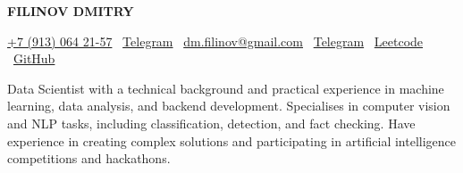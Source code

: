 \begin{center}
  {\huge\rmfamily\bfseries FILINOV DMITRY}
\end{center}
\begin{center}
\href{tel:+79130642157}{+7 (913) 064 21-57} \textbar\ 
\href{https://t.me/d1ffic00lt}{Telegram} \textbar\ 
\href{mailto:dm.filinov@gmail.com}{dm.filinov@gmail.com} \textbar\
  \href{https://t.me/D1ffic00lt}{Telegram} \textbar\ 
  \href{https://leetcode.com/u/D1ffic00lt/}{Leetcode} \textbar\ 
  \href{https://github.com/D1ffic00lt}{GitHub}
\end{center}
Data Scientist with a technical background and practical experience in machine learning, data analysis, and backend development. Specialises in computer vision and NLP tasks, including classification, detection, and fact checking. Have experience in creating complex solutions and participating in artificial intelligence competitions and hackathons.
